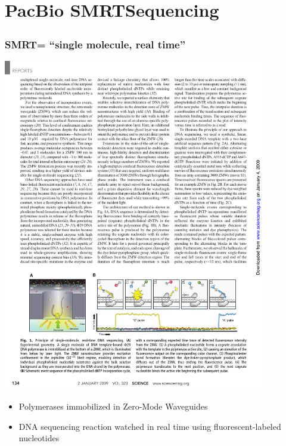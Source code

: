 \documentclass[serif,11pt]{beamer}
\newcommand{\R}{\textsuperscript{\textregistered}}
\begin{document}
\section{PacBio SMRT\R Sequencing}
\label{sec-3}
\begin{frame}

  \sectionpage
\end{frame}
\begin{frame}
\frametitle{SMRT\R = ``single molecule, real time''}
\label{sec-3-1}

   \includegraphics[width=4.5in]{img/smrt-cartoon.pdf}
   \newline {\tiny [Eid, 2009]}
\begin{itemize}
\item Polymerases immobilized in Zero-Mode Waveguides
\item DNA sequencing reaction watched in real time using
     fluorescent-labeled nucleotides
\end{itemize}
\end{frame}
\end{document}
